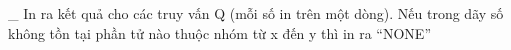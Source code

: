 \_ In ra kết quả cho các truy vấn Q (mỗi số in trên một dòng). Nếu trong dãy số không tồn tại phần tử nào thuộc nhóm từ x đến y thì in ra “NONE”